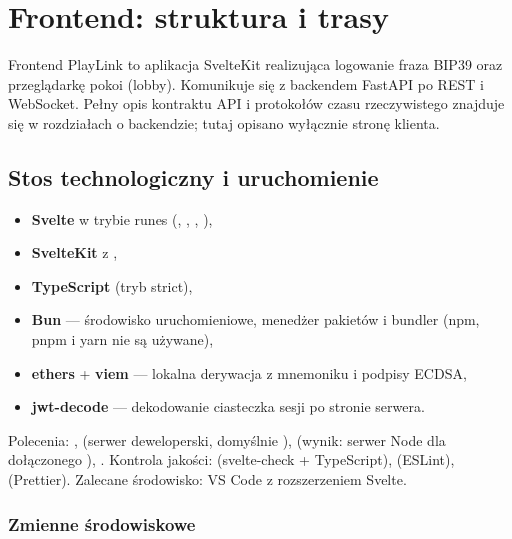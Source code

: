 
\chapter{Frontend: struktura i trasy}\label{ch:fe-trasy}

Frontend PlayLink to aplikacja SvelteKit realizująca logowanie fraza BIP39 oraz przeglądarkę
pokoi (lobby). Komunikuje się z backendem FastAPI po REST i WebSocket. Pełny opis kontraktu API
i protokołów czasu rzeczywistego znajduje się w rozdziałach o backendzie; tutaj opisano
wyłącznie stronę klienta.

\section{Stos technologiczny i uruchomienie}\label{sec:fe-stos}

\begin{itemize}[nosep]
  \item \textbf{Svelte}  w trybie runes (, , , ),
  \item \textbf{SvelteKit}  z ,
  \item \textbf{TypeScript} (tryb strict),
  \item \textbf{Bun} --- środowisko uruchomieniowe, menedżer pakietów i bundler (npm, pnpm i yarn nie są używane),
  \item \textbf{ethers} + \textbf{viem} --- lokalna derywacja z mnemoniku i podpisy ECDSA,
  \item \textbf{jwt-decode} --- dekodowanie ciasteczka sesji po stronie serwera.
\end{itemize}

Polecenia: ,  (serwer deweloperski, domyślnie
),  (wynik: serwer Node dla dołączonego
), . Kontrola jakości: 
(svelte-check + TypeScript),  (ESLint),  (Prettier).
Zalecane środowisko: VS Code z rozszerzeniem Svelte.

\subsection{Zmienne środowiskowe}

